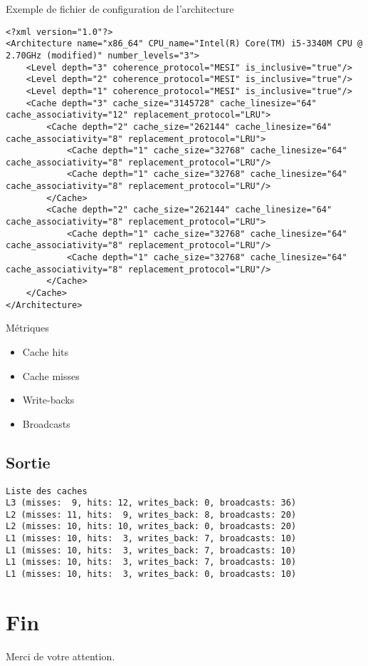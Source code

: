 \documentclass{beamer}
\begin{document}
\begin{frame}[fragile]
Exemple de fichier de configuration de l'architecture
\begin{lstlisting}
<?xml version="1.0"?>
<Architecture name="x86_64" CPU_name="Intel(R) Core(TM) i5-3340M CPU @ 2.70GHz (modified)" number_levels="3">
    <Level depth="3" coherence_protocol="MESI" is_inclusive="true"/>
    <Level depth="2" coherence_protocol="MESI" is_inclusive="true"/>
    <Level depth="1" coherence_protocol="MESI" is_inclusive="true"/>
    <Cache depth="3" cache_size="3145728" cache_linesize="64" cache_associativity="12" replacement_protocol="LRU">
        <Cache depth="2" cache_size="262144" cache_linesize="64" cache_associativity="8" replacement_protocol="LRU">
            <Cache depth="1" cache_size="32768" cache_linesize="64" cache_associativity="8" replacement_protocol="LRU"/>
            <Cache depth="1" cache_size="32768" cache_linesize="64" cache_associativity="8" replacement_protocol="LRU"/>
        </Cache>
        <Cache depth="2" cache_size="262144" cache_linesize="64" cache_associativity="8" replacement_protocol="LRU">
            <Cache depth="1" cache_size="32768" cache_linesize="64" cache_associativity="8" replacement_protocol="LRU"/>
            <Cache depth="1" cache_size="32768" cache_linesize="64" cache_associativity="8" replacement_protocol="LRU"/>
        </Cache>
    </Cache>
</Architecture>
\end{lstlisting}
\end{frame}

\begin{frame}
\begin{block}{Métriques}
\begin{itemize}
  \item{Cache hits}
  \item{Cache misses}
  \item{Write-backs}
  \item{Broadcasts}
\end{itemize}
\end{block}
\end{frame}

\subsection{Sortie}
\begin{frame}[fragile]
\begin{verbatim}
Liste des caches
L3 (misses:  9, hits: 12, writes_back: 0, broadcasts: 36)
L2 (misses: 11, hits:  9, writes_back: 8, broadcasts: 20)
L2 (misses: 10, hits: 10, writes_back: 0, broadcasts: 20)
L1 (misses: 10, hits:  3, writes_back: 7, broadcasts: 10)
L1 (misses: 10, hits:  3, writes_back: 7, broadcasts: 10)
L1 (misses: 10, hits:  3, writes_back: 7, broadcasts: 10)
L1 (misses: 10, hits:  3, writes_back: 0, broadcasts: 10)
\end{verbatim}
\end{frame}

\section*{Fin}
\begin{frame}
\begin{center}
Merci de votre attention.
\end{center}
\end{frame}
\end{document}
